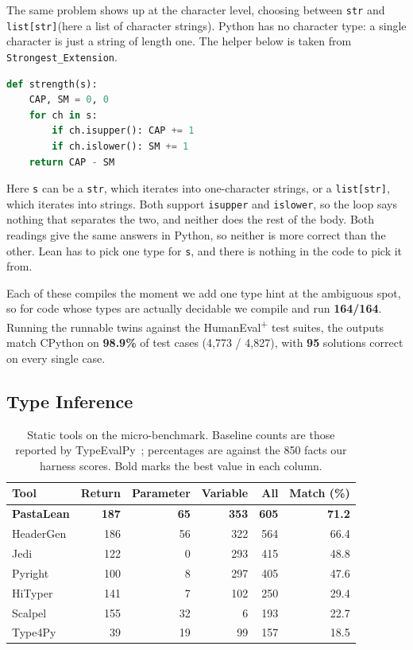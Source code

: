 \documentclass{article}
\newcommand{\code}{\lstinline}
\begin{document}
The same problem shows up at the character level, choosing between \code{str} and \code{list[str]}(here a list of character strings). Python has no character type: a single character is just a string of length one. The helper below is taken from \code{Strongest_Extension}.

\begin{lstlisting}[language=python]
def strength(s):
    CAP, SM = 0, 0
    for ch in s:
        if ch.isupper(): CAP += 1
        if ch.islower(): SM += 1
    return CAP - SM
\end{lstlisting}

Here \code{s} can be a \code{str}, which iterates into one-character strings, or a \code{list[str]}, which iterates into strings. Both support \code{isupper} and \code{islower}, so the loop says nothing that separates the two, and neither does the rest of the body. Both readings give the same answers in Python, so neither is more correct than the other. Lean has to pick one type for \code{s}, and there is nothing in the code to pick it from.

Each of these compiles the moment we add one type hint at the ambiguous spot, so for code whose types are actually decidable we compile and run \textbf{164/164}. Running the runnable twins against the HumanEval\textsuperscript{+} test suites, the outputs match CPython on \textbf{98.9\%} of test cases (4{,}773 / 4{,}827), with \textbf{95} solutions correct on every single case.

\subsection{Type Inference}\label{app:eval-type}


\begin{table}[t]
\centering
\begin{tabular}{@{}lrrrrr@{}}
\toprule
Tool & Return & Parameter & Variable & All & Match (\%) \\
\midrule
\textbf{PastaLean} & \textbf{187} & \textbf{65} & \textbf{353} & \textbf{605} & \textbf{71.2} \\
HeaderGen          & 186 & 56 & 322 & 564 & 66.4 \\
Jedi               & 122 & 0  & 293 & 415 & 48.8 \\
Pyright            & 100 & 8  & 297 & 405 & 47.6 \\
HiTyper            & 141 & 7  & 102 & 250 & 29.4 \\
Scalpel            & 155 & 32 & 6   & 193 & 22.7 \\
Type4Py            & 39  & 19 & 99  & 157 & 18.5 \\
\bottomrule
\end{tabular}
\caption{Static tools on the micro-benchmark. Baseline counts are those reported by TypeEvalPy~\cite{typeevalpy}; percentages are against the 850 facts our harness scores. Bold marks the best value in each column.}
\label{tab:static-micro}
\end{table}
\end{document}
